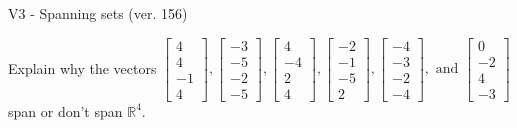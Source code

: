 \begin{exercise}
  \begin{exerciseTitle}V3 - Spanning sets (ver. 156)\end{exerciseTitle}
  \begin{exerciseStatement}
    Explain why the vectors \(\left[\begin{array}{r}
4 \\
4 \\
-1 \\
4
\end{array}\right] , \left[\begin{array}{r}
-3 \\
-5 \\
-2 \\
-5
\end{array}\right] , \left[\begin{array}{r}
4 \\
-4 \\
2 \\
4
\end{array}\right] , \left[\begin{array}{r}
-2 \\
-1 \\
-5 \\
2
\end{array}\right] , \left[\begin{array}{r}
-4 \\
-3 \\
-2 \\
-4
\end{array}\right] , \text{ and } \left[\begin{array}{r}
0 \\
-2 \\
4 \\
-3
\end{array}\right]\) span or don't span \(\mathbb{R}^4\). 
	



\end{exerciseStatement}
\end{exercise}
